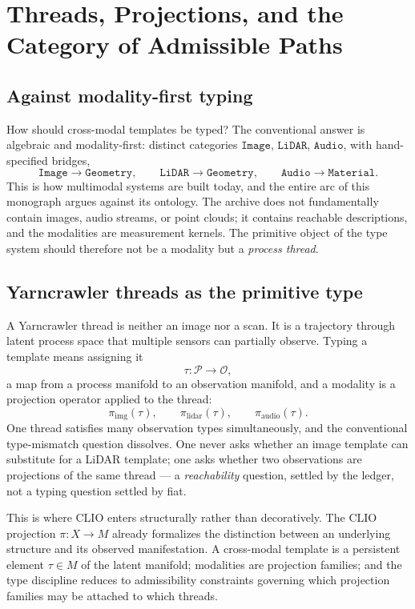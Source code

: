 \documentclass[11pt,oneside]{book}
\theoremstyle{remark}
\begin{document}
\chapter{Threads, Projections, and the Category of Admissible Paths}

\section{Against modality-first typing}

How should cross-modal templates be typed? The conventional answer is
algebraic and modality-first: distinct categories
$\texttt{Image}$, $\texttt{LiDAR}$, $\texttt{Audio}$, with
hand-specified bridges,
\[
\texttt{Image} \to \texttt{Geometry}, \qquad
\texttt{LiDAR} \to \texttt{Geometry}, \qquad
\texttt{Audio} \to \texttt{Material}.
\]
This is how multimodal systems are built today, and the entire arc of
this monograph argues against its ontology. The archive does not
fundamentally contain images, audio streams, or point clouds; it
contains reachable descriptions, and the modalities are measurement
kernels. The primitive object of the type system should therefore not
be a modality but a \emph{process thread}.

\section{Yarncrawler threads as the primitive type}

A Yarncrawler thread is neither an image nor a scan. It is a
trajectory through latent process space that multiple sensors can
partially observe. Typing a template means assigning it
\[
\tau : \mathcal{P} \longrightarrow \mathcal{O},
\]
a map from a process manifold to an observation manifold, and a
modality is a projection operator applied to the thread:
\[
\pi_{\mathrm{img}}(\tau), \qquad
\pi_{\mathrm{lidar}}(\tau), \qquad
\pi_{\mathrm{audio}}(\tau).
\]
One thread satisfies many observation types simultaneously, and the
conventional type-mismatch question dissolves. One never asks whether
an image template can substitute for a LiDAR template; one asks whether
two observations are projections of the same thread --- a
\emph{reachability} question, settled by the ledger, not a typing
question settled by fiat.

This is where CLIO enters structurally rather than decoratively. The
CLIO projection $\pi : X \to M$ already formalizes the distinction
between an underlying structure and its observed manifestation. A
cross-modal template is a persistent element $\tau \in M$ of the latent
manifold; modalities are projection families; and the type discipline
reduces to admissibility constraints governing which projection
families may be attached to which threads.
\end{document}
